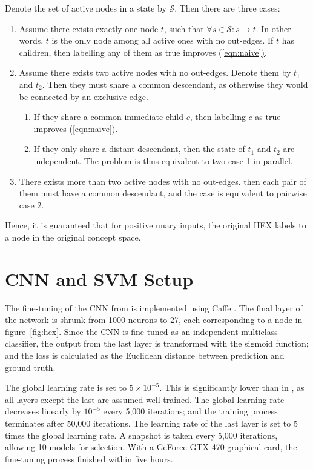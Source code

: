 \documentclass[11pt,a4paper]{article}
\begin{document}
Denote the set of active nodes in a state by $\mathcal{S}$. Then there are three cases:
\begin{enumerate}
\item Assume there exists exactly one node $t$, such that $\forall s\in\mathcal{S}:s\rightarrow t$. In other words, $t$ is the only node among all active ones with no out-edges. If $t$ has children, then labelling any of them as true improves \hyperref[eqn:naive]{(\ref{eqn:naive})}.
\item Assume there exists two active nodes with no out-edges. Denote them by $t_1$ and $t_2$. Then they must share a common descendant, as otherwise they would be connected by an exclusive edge.
\begin{enumerate}
\item If they share a common immediate child $c$, then labelling $c$ as true improves \hyperref[eqn:naive]{(\ref{eqn:naive})}.
\item If they only share a distant descendant, then the state of $t_1$ and $t_2$ are independent. The problem is thus equivalent to two case 1 in parallel.
\end{enumerate}
\item There exists more than two active nodes with no out-edges. then each pair of them must have a common descendant, and the case is equivalent to pairwise case 2.
\end{enumerate}
Hence, it is guaranteed that for positive unary inputs, the original HEX labels to a node in the original concept space.

\section{CNN and SVM Setup}
\label{sec:setup}

The fine-tuning of the CNN from \cite{krizhevsky2012imagenet} is implemented using Caffe \cite{jia2014caffe}. The final layer of the network is shrunk from 1000 neurons to 27, each corresponding to a node in \hyperref[fig:hex]{figure~\ref{fig:hex}}. Since the CNN is fine-tuned as an independent multiclass classifier, the output from the last layer is transformed with the sigmoid function; and the loss is calculated as the Euclidean distance between prediction and ground truth.

The global learning rate is set to $5\times10^{-5}$. This is significantly lower than in \cite{krizhevsky2012imagenet}, as all layers except the last are assumed well-trained. The global learning rate decreases linearly by $10^{-5}$ every 5,000 iterations; and the training process terminates after 50,000 iterations. The learning rate of the last layer is set to 5 times the global learning rate. A snapshot is taken every 5,000 iterations, allowing 10 models for selection. With a GeForce GTX 470 graphical card, the fine-tuning process finished within five hours.
\end{document}
